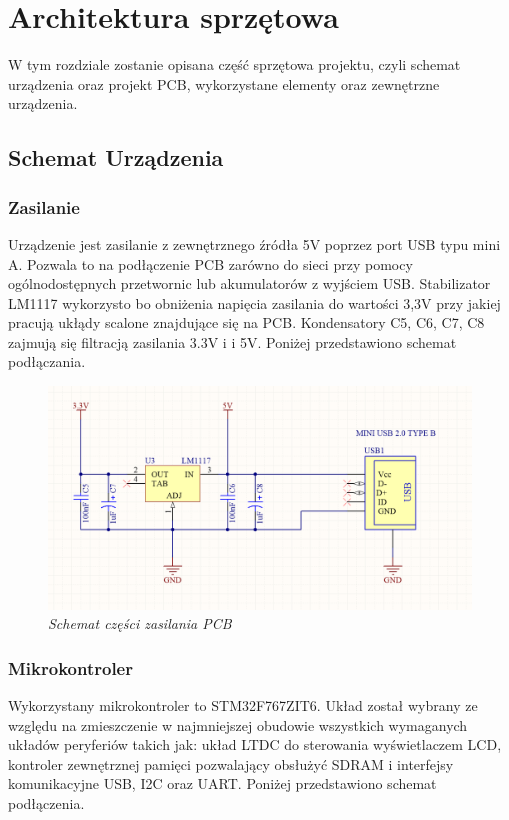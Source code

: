 \documentclass[eng,printmode]{mgr}
\begin{document}
\chapter{ Architektura sprzętowa}
W tym rozdziale zostanie opisana część sprzętowa projektu, czyli schemat urządzenia oraz projekt PCB, wykorzystane elementy oraz zewnętrzne urządzenia.


\section{ Schemat Urządzenia}
\subsection*{Zasilanie}
Urządzenie jest zasilanie z zewnętrznego źródła 5V poprzez port USB typu mini A. Pozwala to na podłączenie PCB zarówno do sieci przy pomocy ogólnodostępnych przetwornic lub akumulatorów z wyjściem USB. Stabilizator LM1117 wykorzysto bo obniżenia napięcia zasilania do wartości 3,3V przy jakiej pracują ukłądy scalone znajdujące się na PCB. Kondensatory C5, C6, C7, C8 zajmują się filtracją zasilania 3.3V i i 5V.
Poniżej przedstawiono schemat podłączania.

\begin{figure}[!h]
    \centering
    \includegraphics[width=\textwidth]{schematics/power.png}
    \caption{\textit{Schemat części zasilania PCB}}
\end{figure}
\subsection*{Mikrokontroler}
Wykorzystany mikrokontroler to STM32F767ZIT6. Układ został wybrany ze względu na zmieszczenie w najmniejszej obudowie wszystkich wymaganych układów peryferiów takich jak: układ LTDC do sterowania wyświetlaczem LCD, kontroler zewnętrznej pamięci pozwalający obsłużyć SDRAM i interfejsy komunikacyjne USB, I2C oraz UART. Poniżej przedstawiono schemat podłączenia.
\end{document}
